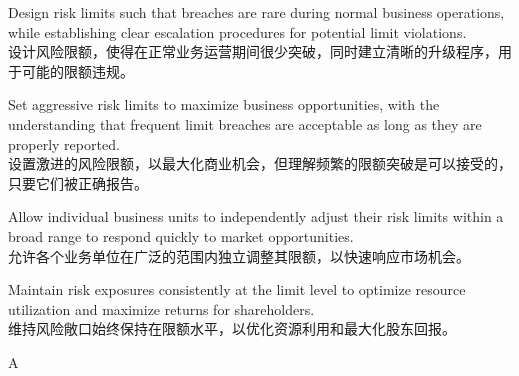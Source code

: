 \documentclass{article}
\begin{document}
    \begin{choices}
        \item Design risk limits such that breaches are rare during normal business operations, while establishing clear escalation procedures for potential limit violations.\\
        设计风险限额，使得在正常业务运营期间很少突破，同时建立清晰的升级程序，用于可能的限额违规。
    
        \item Set aggressive risk limits to maximize business opportunities, with the understanding that frequent limit breaches are acceptable as long as they are properly reported.\\
        设置激进的风险限额，以最大化商业机会，但理解频繁的限额突破是可以接受的，只要它们被正确报告。
    
        \item Allow individual business units to independently adjust their risk limits within a broad range to respond quickly to market opportunities.\\
        允许各个业务单位在广泛的范围内独立调整其限额，以快速响应市场机会。
    
        \item Maintain risk exposures consistently at the limit level to optimize resource utilization and maximize returns for shareholders.\\
        维持风险敞口始终保持在限额水平，以优化资源利用和最大化股东回报。
    \end{choices}
    
    \begin{correctanswer}
        A
    \end{correctanswer}
    
\end{document}
